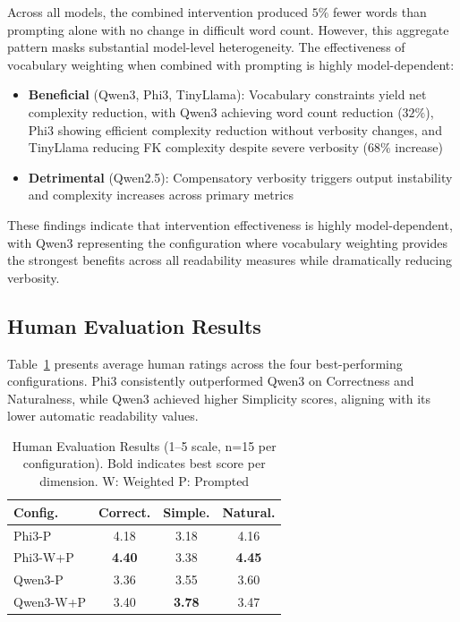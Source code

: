 \documentclass[10pt, a4paper]{article}
\begin{document}
Across all models, the combined intervention produced $5\%$ fewer words than prompting alone with no change in difficult word count. However, this aggregate pattern masks substantial model-level heterogeneity. The effectiveness of vocabulary weighting when combined with prompting is highly model-dependent:

 \begin{itemize}
     \item \textbf{Beneficial} (Qwen3, Phi3, TinyLlama): Vocabulary constraints yield net complexity reduction, with Qwen3 achieving word count reduction ($32\%$), Phi3 showing efficient complexity reduction without verbosity changes, and TinyLlama reducing FK complexity despite severe verbosity ($68\%$ increase)
     \item \textbf{Detrimental} (Qwen2.5): Compensatory verbosity triggers output instability and complexity increases across primary metrics
 \end{itemize}

These findings indicate that intervention effectiveness is highly model-dependent, with Qwen3 representing the configuration where vocabulary weighting provides the strongest benefits across all readability measures while dramatically reducing verbosity.

\subsection{Human Evaluation Results}

Table~\ref{tab:human-eval} presents average human ratings across the four best-performing configurations. Phi3 consistently outperformed Qwen3 on Correctness and Naturalness, while Qwen3 achieved higher Simplicity scores, aligning with its lower automatic readability values.

\begin{table}[!ht]
\begin{center}
\begin{tabular}{lccc}
\hline
\textbf{Config.} & \textbf{Correct.} & \textbf{Simple.} & \textbf{Natural.} \\
\hline
Phi3-P           & 4.18 & 3.18 & 4.16 \\
Phi3-W+P  & \textbf{4.40} & 3.38 & \textbf{4.45} \\
Qwen3-P          & 3.36 & 3.55 & 3.60 \\
Qwen3-W+P & 3.40 & \textbf{3.78} & 3.47 \\
\hline
\end{tabular}
\caption{Human Evaluation Results (1--5 scale, n=15 per configuration). Bold indicates best score per dimension. W: Weighted P: Prompted}
\label{tab:human-eval}
\end{center}
\end{table}
\end{document}
